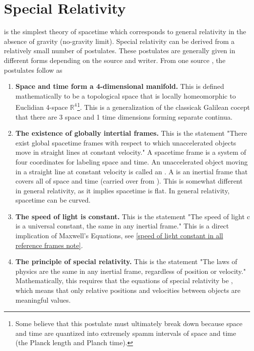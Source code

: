 \section{Special Relativity}

 is the simplest theory of spacetime which corresponds to general relativity in the absence of gravity (no-gravity limit). Special relativity can be derived from a relatively small number of postulates. These postulates are generally given in different forms depending on the source and writer. From one source \cite{bib:General Relativity, Black Holes, and Cosmology}, the postulates follow as

\begin{enumerate}
	\item \textbf{Space and time form a 4-dimensional manifold.} This is defined mathematically to be a topological space that is locally homeomorphic to Euclidian 4-space $\mathbb{R}^4$\footnote{Some believe that this postulate must ultimately break down because space and time are quantized into extremely spamm intervals of space and time (the Planck length and Planch time).}. This is a generalization of the classicak Galilean cocept that there are 3 space and 1 time dimensions forming separate continua.
 	\item \textbf{The existence of globally intertial frames.} This is the statement "There exist global spacetime frames with
respect to which unaccelerated objects move in straight lines at constant velocity." A spacetime frame is a system of four coordinates for labeling space and time. An unaccelerated object moving in a straight line at constant velocity is called an . A  is an inertial frame that covers all of space and time (carried over from ). This is somewhat different in general relativity, as it implies spacetime is flat. In general relativity, spacetime can be curved.
	\item \textbf{The speed of light is constant.} This is the statement "The speed of light c is a universal constant, the same in
any inertial frame." This is a direct implication of Maxwell's Equations, see \ref{speed of light constant in all reference frames note}.
	\item{} \textbf{The principle of special relativity.} This is the statement "The laws of physics are the same in any inertial frame, regardless of position or velocity." Mathematically, this requires that the equations of special relativity be , which means that only relative positions and velocities between objects are meaningful values.
\end{enumerate}


